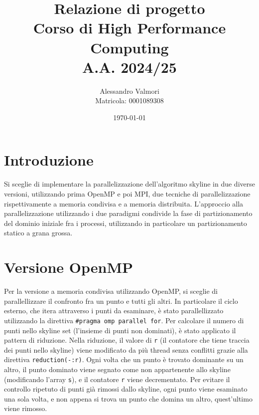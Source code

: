 \documentclass[letterpaper,11pt,leqno]{article}
\title{\vspace{-1cm} Relazione di progetto \\ Corso di High Performance Computing \\ A.A. 2024/25}
\author{Alessandro Valmori \\ Matricola: 0001089308}
\date{\vspace{-0.3cm} \today}  %
\begin{document}
\begingroup\let\newpage\relax\maketitle\endgroup  %

\vspace{-1cm}  %





\section{Introduzione}\label{s:introduction}
 
Si sceglie di implementare la parallelizzazione dell'algoritmo skyline in due diverse versioni, utilizzando prima OpenMP e poi MPI, due tecniche di parallelizzazione rispettivamente a memoria condivisa e a memoria distribuita. L'approccio alla parallelizzazione utilizzando i due paradigmi condivide la fase di partizionamento del dominio iniziale fra i processi, utilizzando in particolare un partizionamento statico a grana grossa. 



\section{Versione OpenMP}\label{s:section}


Per la versione a memoria condivisa utilizzando OpenMP, si sceglie di parallellizzare il confronto fra un punto e tutti gli altri. In particolare il ciclo esterno, che itera attraverso i punti da esaminare, è stato parallellizzato utilizzando la direttiva \texttt{\#pragma omp parallel for}. Per calcolare il numero di punti nello skyline set (l'insieme di punti non dominati), è stato applicato il pattern di riduzione. Nella riduzione, il valore di \texttt{r} (il contatore che tiene traccia dei punti nello skyline) viene modificato da più thread senza conflitti grazie alla direttiva \texttt{reduction(-:r)}. Ogni volta che un punto è trovato dominante su un altro, il punto dominato viene segnato come non appartenente allo skyline (modificando l'array \texttt{s}), e il contatore \texttt{r} viene decrementato. Per evitare il controllo ripetuto di punti già rimossi dallo skyline, ogni punto viene esaminato una sola volta, e non appena si trova un punto che domina un altro, quest'ultimo viene rimosso.
\end{document}
